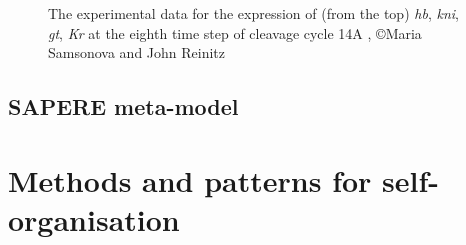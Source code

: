 \documentclass[12pt,a4paper,twoside,openright]{book}
\begin{document}
\begin{figure}
\caption[Drosophila experimental data]{The experimental data for the expression of (from the top) \emph{hb}, \emph{kni}, \emph{gt}, \emph{Kr} at the eighth time step of cleavage cycle 14A  \cite{database-2008}, \copyright Maria Samsonova and John Reinitz}
\label{fig:expdata}
\end{figure}


\chapter{SAPERE meta-model}

\part{Methods and patterns for self-organisation}
\end{document}
